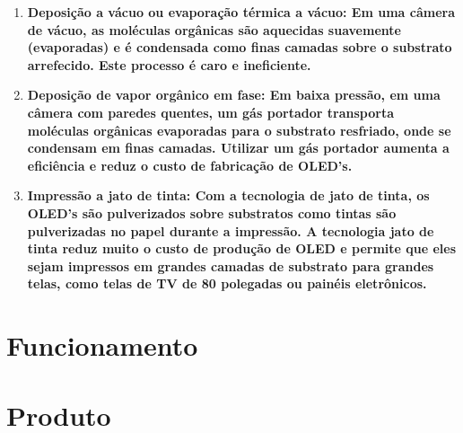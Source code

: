 \begin{enumerate}
	\item \bf{Deposição a vácuo ou evaporação térmica a vácuo:} Em uma câmera de vácuo, as moléculas orgânicas são aquecidas suavemente (evaporadas) e é condensada como finas camadas sobre o substrato arrefecido. Este processo é caro e ineficiente.

	\item \bf{Deposição de vapor orgânico em fase:} Em baixa pressão, em uma câmera com paredes quentes, um gás portador transporta moléculas orgânicas evaporadas para o substrato resfriado, onde se condensam em finas camadas. Utilizar um gás portador aumenta a eficiência e reduz o custo de fabricação de OLED's.

	\item \bf{Impressão a jato de tinta:} Com a tecnologia de jato de tinta, os OLED's são pulverizados sobre substratos como tintas são pulverizadas no papel durante a impressão. A tecnologia jato de tinta reduz muito o custo de produção de OLED e permite que eles sejam impressos em grandes camadas de substrato para grandes telas, como telas de TV de 80 polegadas ou painéis eletrônicos.
\end{enumerate}


\section{Funcionamento}
\label{sec:funcionamento}


\section{Produto}
\label{sec:funcionamento}














